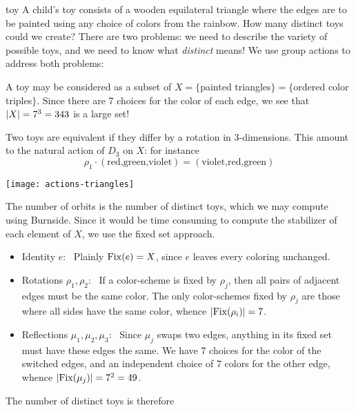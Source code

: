 \begin{example}{}{toy}
	A child's toy consists of a wooden equilateral triangle where the edges are to be painted using any choice of colors from the rainbow. How many distinct toys could we create?\smallbreak
	There are two problems: we need to describe the variety of possible toys, and we need to know what \emph{distinct} means!\smallbreak
	We use group actions to address both problems:
	\begin{itemize}
	  \item A toy may be considered as a subset of $X=\{$painted triangles$\}=\{$ordered color triples$\}$. Since there are 7 choices for the color of each edge, we see that $\left| X\right|=7^3=343$ is a large set!
		\begin{minipage}[t]{0.55\linewidth}\vspace{0pt}
		  \item Two toys are equivalent if they differ by a rotation in 3-dimensions. This amount to the natural action of $D_3$ on $X$: for instance
		  \[
		  	\rho_1\cdot (\text{red,green,violet})
		  	=(\text{violet,red,green})
		  \]
		\end{minipage}
		\hfill
		\begin{minipage}[t]{0.4\linewidth}\vspace{0pt}
			\hfill\texttt{[image: actions-triangles]}
		\end{minipage}
	\end{itemize}
	The number of orbits is the number of distinct toys, which we may compute using Burnside. Since it would be time consuming to compute the stabilizer of each element of $X$, we use the fixed set approach.
	\begin{itemize}
	  \item Identity $e$: \ Plainly $\operatorname{Fix}(e)=X$, since $e$ leaves every coloring unchanged.
	  \item Rotations $\rho_1,\rho_2$: \ If a color-scheme is fixed by $\rho_j$, then all pairs of adjacent edges must be the same color. The only color-schemes fixed by $\rho_j$ are those where all sides have the same color, whence $\left| \operatorname{Fix}(\rho_i)\right|=7$.
	  \item Reflections $\mu_1,\mu_2,\mu_3$: \ Since $\mu_j$ swaps two edges, anything in its fixed set must have these edges the same. We have 7 choices for the color of the switched edges, and an independent choice of 7 colors for the other edge, whence $\left| \operatorname{Fix}(\mu_j)\right|=7^2=49$.
	\end{itemize}
	The number of distinct toys is therefore
	\begin{align*}

\end{align*}
\end{example}
